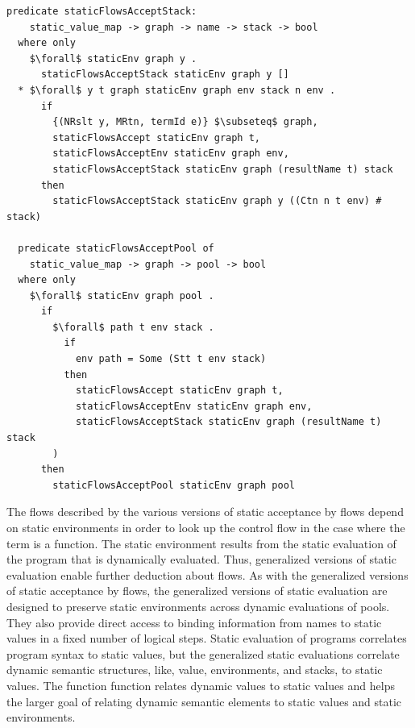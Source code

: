 \documentclass[letterpaper, 11pt]{extarticle}
\begin{document}
\begin{lstlisting}[language=logic, mathescape]
  predicate staticFlowsAcceptStack:
    static_value_map -> graph -> name -> stack -> bool
  where only
    $\forall$ staticEnv graph y .
      staticFlowsAcceptStack staticEnv graph y []
  * $\forall$ y t graph staticEnv graph env stack n env .
      if 
        {(NRslt y, MRtn, termId e)} $\subseteq$ graph,
        staticFlowsAccept staticEnv graph t,
        staticFlowsAcceptEnv staticEnv graph env,
        staticFlowsAcceptStack staticEnv graph (resultName t) stack 
      then 
        staticFlowsAcceptStack staticEnv graph y ((Ctn n t env) # stack)

  predicate staticFlowsAcceptPool of
    static_value_map -> graph -> pool -> bool
  where only
    $\forall$ staticEnv graph pool .
      if
        $\forall$ path t env stack .
          if
            env path = Some (Stt t env stack)
          then 
            staticFlowsAccept staticEnv graph t, 
            staticFlowsAcceptEnv staticEnv graph env, 
            staticFlowsAcceptStack staticEnv graph (resultName t) stack
        ) 
      then
        staticFlowsAcceptPool staticEnv graph pool
\end{lstlisting}

The flows described by the various versions of static acceptance by flows depend on static
environments in order to look up the control flow in the case where the term is a function.
The static environment
results from the static evaluation of the program that is dynamically evaluated. Thus,
generalized
versions of static evaluation enable further deduction about flows.
As with the generalized versions of static acceptance by flows,
the generalized versions of static evaluation are designed to
preserve static environments across
dynamic evaluations of pools. They also provide direct access to binding information from names
to static values in a fixed number of logical steps. Static evaluation of programs correlates
program syntax to static values, but the generalized static evaluations correlate dynamic
semantic structures, like, value, environments, and stacks, to static values. The function
function relates dynamic values to static values and helps the larger goal of relating dynamic
semantic elements to static values and static environments.    
\end{document}
